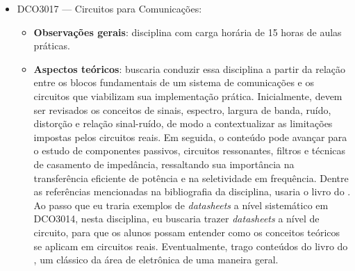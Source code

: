 \documentclass{article}
\begin{document}
\begin{itemize}
\begin{itemize}
        \item \textbf{Ferramentas de apoio}: a disciplina não prevê aulas práticas, mas costumo utilizar ferramentas de simulação para a análise da performance dos sistemas digitais. Inicialmente, o Logisim-evolution \cite{burchLogisimevolution2024} pode ser utilizado como ferramenta de apoio à visualização e simulação de circuitos sequenciais, registradores, contadores e máquinas de estados, permitindo que os alunos compreendam de forma intuitiva a evolução temporal dos sinais digitais. Em seguida, para os tópicos de projeto \gls{rtl}, descrição em \gls{hdl} e implementação de máquinas sequenciais em \gls{vhdl}, recomendo o uso do EDA Playground, por ser uma plataforma online que permite escrever, simular e testar códigos \gls{vhdl} diretamente no navegador, incluindo o uso de \textit{testbenches}. Caso haja disponibilidade de laboratório com placas de desenvolvimento, o fluxo pode ser complementado com ferramentas como Quartus ou Vivado, permitindo que os projetos sejam sintetizados e implementados em dispositivos programáveis. Dessa forma, a disciplina pode articular a compreensão conceitual dos circuitos digitais com a prática moderna de projeto, simulação e implementação em \gls{hdl}. Particularmente, tive experiência com o kit de desenvolvimento DE0-Nano, da Altera, onde desenvolvi projetos de circuitos digitais sequenciais em \gls{vhdl} e os implementei na placa.
    \end{itemize}
    \item DCO3017 --- Circuitos para Comunicações:
    \begin{itemize}
        \item \textbf{Observações gerais}: disciplina com carga horária de 15 horas de aulas práticas.
        \item \textbf{Aspectos teóricos}: buscaria conduzir essa disciplina a partir da relação entre os blocos fundamentais de um sistema de comunicações e os circuitos que viabilizam sua implementação prática. Inicialmente, devem ser revisados os conceitos de sinais, espectro, largura de banda, ruído, distorção e relação sinal-ruído, de modo a contextualizar as limitações impostas pelos circuitos reais. Em seguida, o conteúdo pode avançar para o estudo de componentes passivos, circuitos ressonantes, filtros e técnicas de casamento de impedância, ressaltando sua importância na transferência eficiente de potência e na seletividade em frequência. Dentre as referências mencionadas na bibliografia da disciplina, usaria o livro do \textcite{frenzelPrinciplesElectronicCommunication2022}. Ao passo que eu traria exemplos de \textit{datasheets} a nível sistemático em DCO3014, nesta disciplina, eu buscaria trazer \textit{datasheets} a nível de circuito, para que os alunos possam entender como os conceitos teóricos se aplicam em circuitos reais. Eventualmente, trago conteúdos do livro do \textcite{hillArtElectronics2024}, um clássico da área de eletrônica de uma maneira geral.

\end{itemize}
\end{itemize}
\end{document}
